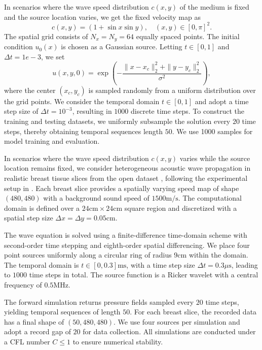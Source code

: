 \documentclass[preprint,numbers,sort&compress]{elsarticle}
\begin{document}
			In scenarios where the wave speed distribution \(c(x,y)\) of the medium is fixed and the source location varies, we get the fixed velocity map as 
			\begin{equation*}
				c(x,y) = (1+\sin x\sin y), \quad (x, y) \in [0, \pi]^2.
			\end{equation*}
			The spatial grid consists of $N_x = N_y = 64$ equally spaced points. The initial condition $u_0(x)$ is chosen as a Gaussian source. Letting $t \in [0, 1]$ and $\Delta t = 1e-3$, we set 
			\[
			u(x, y,0) = \exp\!\left(-\frac{\|x-x_c\|_2^2 + \|y-y_c\|_2^2}{\sigma^2}\right),
			\]
			where the center $(x_c, y_c)$ is sampled randomly from a uniform distribution over the grid points. We consider the temporal domain $t \in [0,1]$ and adopt a time step size of 
			$\Delta t = 10^{-3}$, resulting in $1000$ discrete time steps. To construct the training and testing datasets, we uniformly subsample the solution every $20$ time steps, thereby obtaining temporal sequences length $50$. We use 1000 samples for model training and evaluation.
			
			In scenarios where the wave speed distribution \(c(x,y)\) varies while the source location remains fixed, we consider heterogeneous acoustic wave propagation in realistic breast tissue slices from the open dataset \cite{zeng2025openbreastus}, following the experimental setup in \cite{zeng2023neural}. Each breast slice provides a spatially varying speed map of shape $(480, 480)$ with a background sound speed of $1500 \mathrm{m/s}$. The computational domain is defined over a $24 \mathrm{cm} \times 24 \mathrm{cm}$ square region and discretized with a spatial step size $\Delta x = \Delta y = 0.05 \mathrm{cm}$.
			
			The wave equation is solved using a finite-difference time-domain scheme with second-order time stepping and eighth-order spatial differencing. We place four point sources uniformly along a circular ring of radius $9 
			\mathrm{cm}$ within the domain. The temporal domain is $t \in [0, 0.3] \mathrm{ms}$, with a time step size $\Delta t = 0.3\mu\mathrm{s}$, leading to $1000$ time steps in total. The source function is a Ricker wavelet with a central frequency of $0.5 \mathrm{MHz}$.
			
			The forward simulation returns pressure fields sampled every $20$ time steps, yielding temporal sequences of length $50$. For each breast slice, the recorded data has a final shape of $(50, 480, 480)$. We use four sources per simulation and adopt a record gap of $20$ for data collection. All simulations are conducted under a CFL number $C \le 1$ to ensure numerical stability.
			
\end{document}
